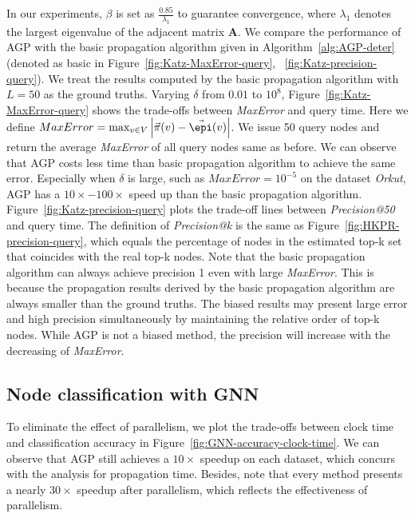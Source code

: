 In our experiments, $\beta$ is set as $\frac{0.85}{\lambda_1}$ to guarantee convergence, where $\lambda_1$ denotes the largest eigenvalue of the adjacent matrix $\bm{A}$. We compare the performance of AGP with the basic propagation algorithm given in Algorithm~\ref{alg:AGP-deter} (denoted as basic in Figure~\ref{fig:Katz-MaxError-query}, ~\ref{fig:Katz-precision-query}). We treat the results computed by the basic propagation algorithm with $L=50$ as the ground truths. Varying $\delta$ from $0.01$ to $10^{8}$, Figure~\ref{fig:Katz-MaxError-query} shows the trade-offs between {\em MaxError} and query time. Here we define $MaxError =\max_{v \in V}\left|\vec{\pi}(v)-\vec{\epi}(v)\right|$. We issue 50 query nodes and return the average {\em MaxError} of all query nodes same as before. We can observe that AGP costs less time than basic propagation algorithm to achieve the same error. Especially when $\delta$ is large, such as $MaxError=10^{-5}$ on the dataset {\em Orkut}, AGP has a $10\times-100\times$ speed up than the basic propagation algorithm. Figure~\ref{fig:Katz-precision-query} plots the trade-off lines between {\em Precision@50} and query time. The definition of {\em Precision@k} is the same as Figure~\ref{fig:HKPR-precision-query}, which equals the percentage of nodes in the estimated top-k set that coincides with the real top-k nodes. 
Note that the basic propagation algorithm can always achieve precision 1 even with large {\em MaxError}. This is because the propagation results derived by the basic propagation algorithm are always smaller than the ground truths. The biased results may present large error and high precision simultaneously by maintaining the relative order of top-k nodes. While AGP is not a biased method, the precision will increase with the decreasing of {\em MaxError}. 







\vspace{-1mm}
\subsection{Node classification with GNN}
To eliminate the effect of parallelism, we plot the trade-offs between clock time and classification accuracy in Figure~\ref{fig:GNN-accuracy-clock-time}. We can observe that AGP still achieves a $10\times$ speedup on each dataset, which concurs with the analysis for propagation time. Besides, note that every method presents a nearly $30\times$ speedup after parallelism, which reflects the effectiveness of parallelism. 








